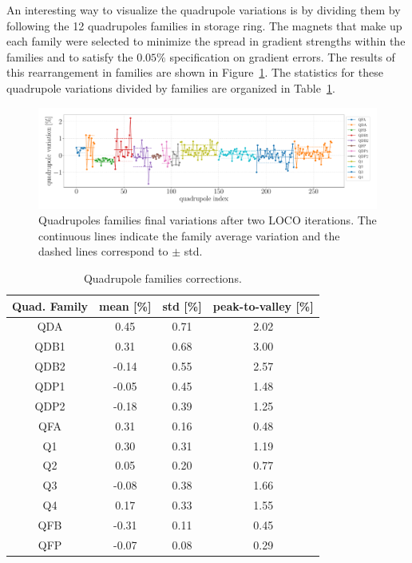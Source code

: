 An interesting way to visualize the quadrupole variations is by dividing them by following the 12 quadrupoles families in storage ring. The magnets that make up each family were selected to minimize the spread in gradient strengths within the families and to satisfy the $0.05\%$ specification on gradient errors. The results of this rearrangement in families are shown in Figure~\ref{fig:loco_corrections_final_families}. The statistics for these quadrupole variations divided by families are organized in Table~\ref{tab:quad_fam_corr}.
\begin{figure}[h!]
\centering
\includegraphics[width=1.0\textwidth]{figures/final_quads_correction_families_fix.pdf}
\caption{Quadrupoles families final variations after two LOCO iterations. The continuous lines indicate the family average variation and the dashed lines correspond to $\pm$ std.}
\label{fig:loco_corrections_final_families}
\end{figure}
\begin{table}[h!]
    \centering
    \caption{Quadrupole families corrections.}
    \label{tab:quad_fam_corr}
    \begin{tabular}{cccc}
        \toprule\toprule
        Quad. Family & mean [\%] & std [\%] & peak-to-valley [\%] \\
        \hline
        QDA  &  0.45  & 0.71 & 2.02 \\
        QDB1 &  0.31  & 0.68 & 3.00 \\
        QDB2 &  -0.14 &  0.55&  2.57 \\
        QDP1 &  -0.05 &  0.45 &  1.48 \\
        QDP2 &  -0.18 &  0.39 &  1.25 \\
        \hline
        QFA  &  0.31  & 0.16 & 0.48 \\
        Q1   &  0.30  & 0.31 & 1.19 \\
        Q2   &  0.05  & 0.20 & 0.77 \\
        Q3   &  -0.08 &  0.38 &  1.66 \\
        Q4   &  0.17  & 0.33 & 1.55 \\
        \hline
        QFB  &  -0.31 & 0.11 &  0.45 \\
        QFP  &  -0.07 &  0.08 &   0.29 \\
        \bottomrule\bottomrule
    \end{tabular}
\end{table}

